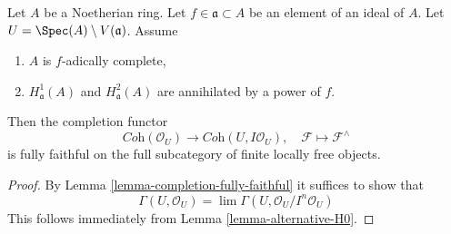 \begin{lemma}
\label{lemma-fully-faithful-alternative}
Let $A$ be a Noetherian ring. Let $f \in \mathfrak a \subset A$
be an element of an ideal of $A$. Let $U = \Spec(A) \setminus V(\mathfrak a)$.
Assume
\begin{enumerate}
\item $A$ is $f$-adically complete,
\item $H^1_\mathfrak a(A)$ and $H^2_\mathfrak a(A)$ are
annihilated by a power of $f$.
\end{enumerate}
Then the completion functor
$$
\textit{Coh}(\mathcal{O}_U)
\longrightarrow
\textit{Coh}(U, I\mathcal{O}_U),
\quad
\mathcal{F} \longmapsto \mathcal{F}^\wedge
$$
is fully faithful on the full subcategory of
finite locally free objects.
\end{lemma}

\begin{proof}
By Lemma \ref{lemma-completion-fully-faithful}
it suffices to show that
$$
\Gamma(U, \mathcal{O}_U) =
\lim \Gamma(U, \mathcal{O}_U/I^n\mathcal{O}_U)
$$
This follows immediately from
Lemma \ref{lemma-alternative-H0}.
\end{proof}
